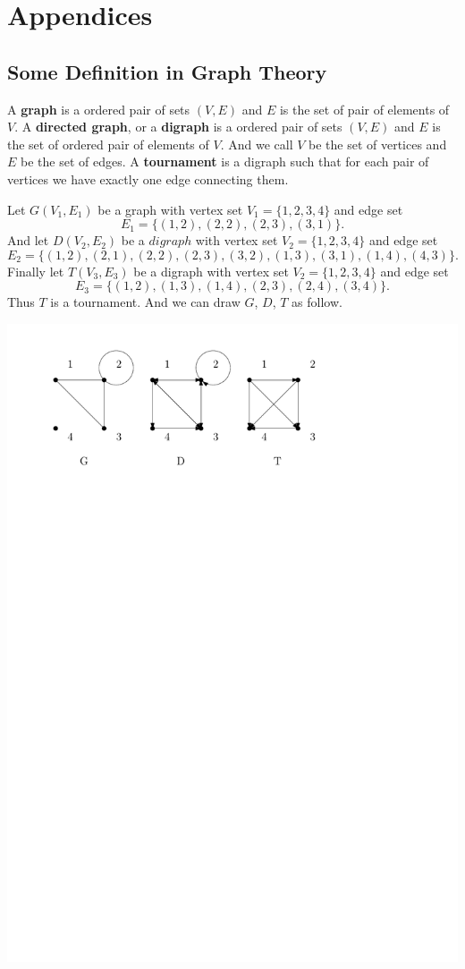 \chapter*{Appendices}
\section*{Some Definition in Graph Theory}
\begin{definition}
A \textbf{graph} is a ordered pair of sets $(V,E)$ and $E$ is the set of pair of elements of $V$. A \textbf{directed graph}, or a \textbf{digraph} is a ordered pair of sets $(V,E)$ and $E$ is the set of ordered pair of elements of $V$. And we call $V$ be the set of vertices and $E$ be the set of edges. A \textbf{tournament} is a digraph such that for each pair of vertices we have exactly one edge connecting them.
\end{definition}
\begin{example}
Let $G(V_1,E_1)$ be a graph with vertex set $V_1=\{1,2,3,4\}$ and edge set 
\[E_1=\{(1,2),(2,2),(2,3),(3,1)\}.\]
And let $D(V_2,E_2)$ be a $digraph$ with vertex set $V_2=\{1,2,3,4\}$ and edge set 
\[E_2=\{(1,2),(2,1),(2,2),(2,3),(3,2),(1,3),(3,1),(1,4),(4,3)\}.\]
Finally let $T(V_3,E_3)$ be a digraph with vertex set $V_2=\{1,2,3,4\}$ and edge set 
\[E_3=\{(1,2),(1,3),(1,4),(2,3),(2,4),(3,4)\}.\]
Thus $T$ is a tournament. And we can draw $G$, $D$, $T$ as follow.
\begin{center}
\includegraphics[scale=0.7]{app-graph}
\end{center}
\end{example}
